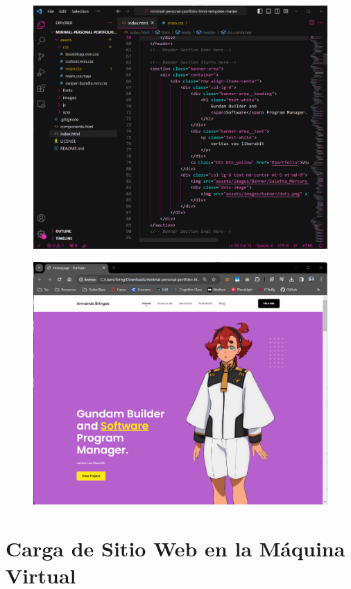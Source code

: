 \documentclass[12pt,a4paper]{article}
\begin{document}
\begin{itemize}
\begin{figure}[H]
    \centering
    \includegraphics[width=.75\linewidth]{M3_Virtualización_y_Contenedores/Tarea_2_Máquina_Virtual_Local/reporte/figuras/5-1_Personalización_Sitio_Web.png}
    \label{fig:Personalización_sitio_web_1}
\end{figure}

\begin{figure}[H]
    \centering
    \includegraphics[width=.75\linewidth]{M3_Virtualización_y_Contenedores/Tarea_2_Máquina_Virtual_Local/reporte/figuras/5-2_Personalización_Sitio_Web.png}
    \label{fig:Personalización_sitio_web_2}
\end{figure}


\section{Carga de Sitio Web en la Máquina Virtual}


\end{itemize}
\end{document}
